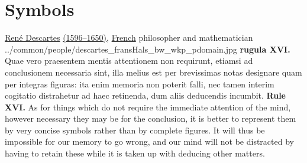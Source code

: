 \section*{Symbols}%
%
\qboxnpqt
  {
    \href{http://en.wikipedia.org/wiki/Descartes}{Ren\'e Descartes} 
    \href{http://www-history.mcs.st-andrews.ac.uk/Timelines/TimelineC.html}{(1596--1650)}, 
    \href{http://www-history.mcs.st-andrews.ac.uk/BirthplaceMaps/Places/France.html}{French} philosopher and mathematician
    \footnotemark
  }
  {../common/people/descartes_fransHals_bw_wkp_pdomain.jpg}
  {{\bf rugula XVI.}
      Quae vero praesentem mentis attentionem non requirunt,
      etiamsi ad conclusionem necessaria sint,
      illa melius est per brevissimas notas designare quam per integras figuras:
      ita enim memoria non poterit falli, nec tamen interim cogitatio distrahetur
      ad haec retinenda, dum aliis deducendis incumbit.}
  {{\bf Rule XVI.}
      As for things which do not require the immediate attention of the mind,
      however necessary they may be for the conclusion,
      it is better to represent them by very concise symbols rather than by
      complete figures.
      It will thus be impossible for our memory to go wrong,
      and our mind will not be distracted by having to retain these
      while it is taken up with deducing other matters.}


